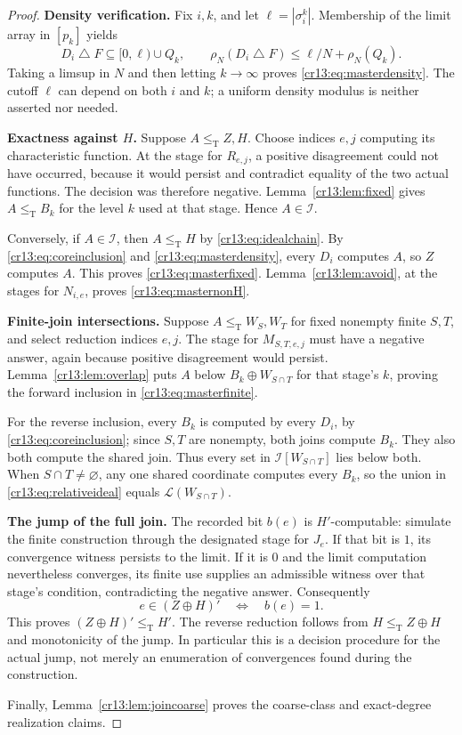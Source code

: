 \documentclass[11pt,letterpaper]{article}
\theoremstyle{definition}
\theoremstyle{remark}\newtheorem{remark}[theorem]{Remark}
\numberwithin{equation}{section}
\newcommand{\leT}{\leq_{\mathrm T}}
\newcommand{\Low}{\mathcal L}
\newcommand{\sd}{\mathbin{\triangle}}
\newcommand{\Ideal}{\mathcal I}
\begin{document}
\begin{proof}
\textbf{Density verification.} Fix $i,k$, and let $\ell=|\sigma_i^k|$. Membership of the limit array in $[p_k]$ yields
\[
             D_i\sd F\subseteq[0,\ell)\cup Q_k,
 \qquad \rho_N(D_i\sd F)\le\ell/N+\rho_N(Q_k).
\]
Taking a limsup in $N$ and then letting $k\to\infty$ proves \eqref{cr13:eq:masterdensity}. The cutoff $\ell$ can depend on both $i$ and $k$; a uniform density modulus is neither asserted nor needed.

\textbf{Exactness against $H$.} Suppose $A\leT Z,H$. Choose indices $e,j$ computing its characteristic function. At the stage for $R_{e,j}$, a positive disagreement could not have occurred, because it would persist and contradict equality of the two actual functions. The decision was therefore negative. Lemma~\ref{cr13:lem:fixed} gives $A\leT B_k$ for the level $k$ used at that stage. Hence $A\in\Ideal$.

Conversely, if $A\in\Ideal$, then $A\leT H$ by \eqref{cr13:eq:idealchain}. By \eqref{cr13:eq:coreinclusion} and \eqref{cr13:eq:masterdensity}, every $D_i$ computes $A$, so $Z$ computes $A$. This proves \eqref{cr13:eq:masterfixed}. Lemma~\ref{cr13:lem:avoid}, at the stages for $N_{i,e}$, proves \eqref{cr13:eq:masternonH}.

\textbf{Finite-join intersections.} Suppose $A\leT W_S,W_T$ for fixed nonempty finite $S,T$, and select reduction indices $e,j$. The stage for $M_{S,T,e,j}$ must have a negative answer, again because positive disagreement would persist. Lemma~\ref{cr13:lem:overlap} puts $A$ below $B_k\oplus W_{S\cap T}$ for that stage's $k$, proving the forward inclusion in \eqref{cr13:eq:masterfinite}.

For the reverse inclusion, every $B_k$ is computed by every $D_i$, by \eqref{cr13:eq:coreinclusion}; since $S,T$ are nonempty, both joins compute $B_k$. They also both compute the shared join. Thus every set in $\Ideal[W_{S\cap T}]$ lies below both. When $S\cap T\ne\varnothing$, any one shared coordinate computes every $B_k$, so the union in \eqref{cr13:eq:relativeideal} equals $\Low(W_{S\cap T})$.

\textbf{The jump of the full join.} The recorded bit $b(e)$ is $H'$-computable: simulate the finite construction through the designated stage for $J_e$. If that bit is $1$, its convergence witness persists to the limit. If it is $0$ and the limit computation nevertheless converges, its finite use supplies an admissible witness over that stage's condition, contradicting the negative answer. Consequently
\[
                       e\in(Z\oplus H)'\quad\Longleftrightarrow\quad b(e)=1.
\]
This proves $(Z\oplus H)'\leT H'$. The reverse reduction follows from $H\leT Z\oplus H$ and monotonicity of the jump. In particular this is a decision procedure for the actual jump, not merely an enumeration of convergences found during the construction.

Finally, Lemma~\ref{cr13:lem:joincoarse} proves the coarse-class and exact-degree realization claims.
\end{proof}
\end{document}
